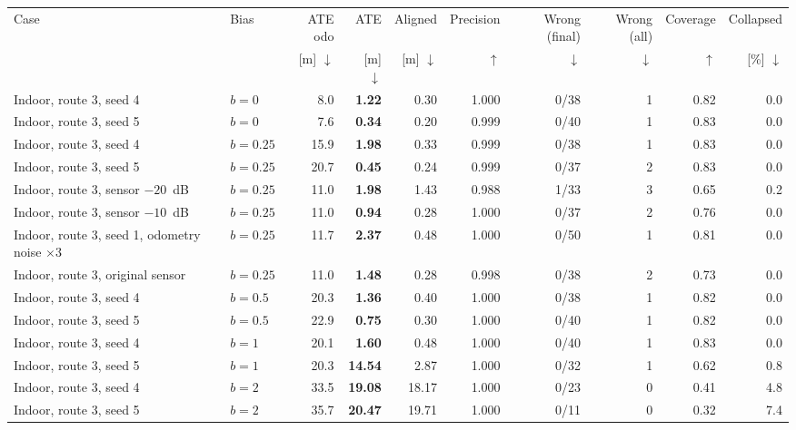 \begin{tabular}{llrrrrrrrr}
\toprule
Case & Bias & ATE odo & ATE & Aligned & Precision & Wrong (final) & Wrong (all) & Coverage & Collapsed \\
 & & [m] $\downarrow$ & [m] $\downarrow$ & [m] $\downarrow$ & $\uparrow$ & $\downarrow$ & $\downarrow$ & $\uparrow$ & [\%] $\downarrow$ \\
\midrule
Indoor, route 3, seed 4 & $b = 0$ & 8.0 & \textbf{1.22} & 0.30 & 1.000 & 0/38 & 1 & 0.82 & 0.0 \\
Indoor, route 3, seed 5 & $b = 0$ & 7.6 & \textbf{0.34} & 0.20 & 0.999 & 0/40 & 1 & 0.83 & 0.0 \\
Indoor, route 3, seed 4 & $b = 0.25$ & 15.9 & \textbf{1.98} & 0.33 & 0.999 & 0/38 & 1 & 0.83 & 0.0 \\
Indoor, route 3, seed 5 & $b = 0.25$ & 20.7 & \textbf{0.45} & 0.24 & 0.999 & 0/37 & 2 & 0.83 & 0.0 \\
Indoor, route 3, sensor $-20$~dB & $b = 0.25$ & 11.0 & \textbf{1.98} & 1.43 & 0.988 & 1/33 & 3 & 0.65 & 0.2 \\
Indoor, route 3, sensor $-10$~dB & $b = 0.25$ & 11.0 & \textbf{0.94} & 0.28 & 1.000 & 0/37 & 2 & 0.76 & 0.0 \\
Indoor, route 3, seed 1, odometry noise $\times 3$ & $b = 0.25$ & 11.7 & \textbf{2.37} & 0.48 & 1.000 & 0/50 & 1 & 0.81 & 0.0 \\
Indoor, route 3, original sensor & $b = 0.25$ & 11.0 & \textbf{1.48} & 0.28 & 0.998 & 0/38 & 2 & 0.73 & 0.0 \\
Indoor, route 3, seed 4 & $b = 0.5$ & 20.3 & \textbf{1.36} & 0.40 & 1.000 & 0/38 & 1 & 0.82 & 0.0 \\
Indoor, route 3, seed 5 & $b = 0.5$ & 22.9 & \textbf{0.75} & 0.30 & 1.000 & 0/40 & 1 & 0.82 & 0.0 \\
Indoor, route 3, seed 4 & $b = 1$ & 20.1 & \textbf{1.60} & 0.48 & 1.000 & 0/40 & 1 & 0.83 & 0.0 \\
Indoor, route 3, seed 5 & $b = 1$ & 20.3 & \textbf{14.54} & 2.87 & 1.000 & 0/32 & 1 & 0.62 & 0.8 \\
Indoor, route 3, seed 4 & $b = 2$ & 33.5 & \textbf{19.08} & 18.17 & 1.000 & 0/23 & 0 & 0.41 & 4.8 \\
Indoor, route 3, seed 5 & $b = 2$ & 35.7 & \textbf{20.47} & 19.71 & 1.000 & 0/11 & 0 & 0.32 & 7.4 \\
\bottomrule
\end{tabular}
